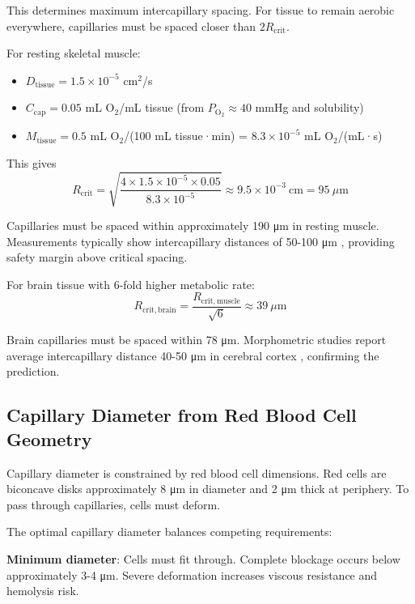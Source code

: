 This determines maximum intercapillary spacing. For tissue to remain aerobic everywhere, capillaries must be spaced closer than $2R_{\mathrm{crit}}$.

For resting skeletal muscle:
\begin{itemize}
\item $D_{\mathrm{tissue}} = 1.5 \times 10^{-5}$ cm$^{2}$/s
\item $C_{\mathrm{cap}} = 0.05$ mL O$_{2}$/mL tissue (from $P_{\mathrm{O}_{2}} \approx 40$ mmHg and solubility)
\item $M_{\mathrm{tissue}} = 0.5$ mL O$_{2}$/(100 mL tissue·min) = $8.3 \times 10^{-5}$ mL O$_{2}$/(mL·s)
\end{itemize}

This gives
\begin{equation}
R_{\mathrm{crit}} = \sqrt{\frac{4 \times 1.5 \times 10^{-5} \times 0.05}{8.3 \times 10^{-5}}} \approx 9.5 \times 10^{-3}~\mathrm{cm} = 95~\mu\mathrm{m}
\end{equation}

Capillaries must be spaced within approximately 190 μm in resting muscle. Measurements typically show intercapillary distances of 50-100 μm \cite{hudlicka1992muscle}, providing safety margin above critical spacing.

For brain tissue with 6-fold higher metabolic rate:
\begin{equation}
R_{\mathrm{crit,brain}} = \frac{R_{\mathrm{crit,muscle}}}{\sqrt{6}} \approx 39~\mu\mathrm{m}
\end{equation}

Brain capillaries must be spaced within 78 μm. Morphometric studies report average intercapillary distance 40-50 μm in cerebral cortex \cite{pawlik1981quantitative}, confirming the prediction.

\subsection{Capillary Diameter from Red Blood Cell Geometry}

Capillary diameter is constrained by red blood cell dimensions. Red cells are biconcave disks approximately 8 μm in diameter and 2 μm thick at periphery. To pass through capillaries, cells must deform.

The optimal capillary diameter balances competing requirements:

\textbf{Minimum diameter}: Cells must fit through. Complete blockage occurs below approximately 3-4 μm. Severe deformation increases viscous resistance and hemolysis risk.

